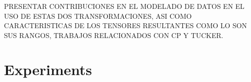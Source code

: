 \documentclass[sensors,article,submit,moreauthors,pdftex]{Definitions/mdpi}
\begin{document}
PRESENTAR CONTRIBUCIONES EN EL MODELADO DE DATOS EN EL USO DE ESTAS DOS TRANSFORMACIONES, ASI COMO CARACTERISTICAS DE LOS TENSORES RESULTANTES COMO LO SON SUS RANGOS, TRABAJOS RELACIONADOS CON CP Y TUCKER.





\section{Experiments}





\end{document}
